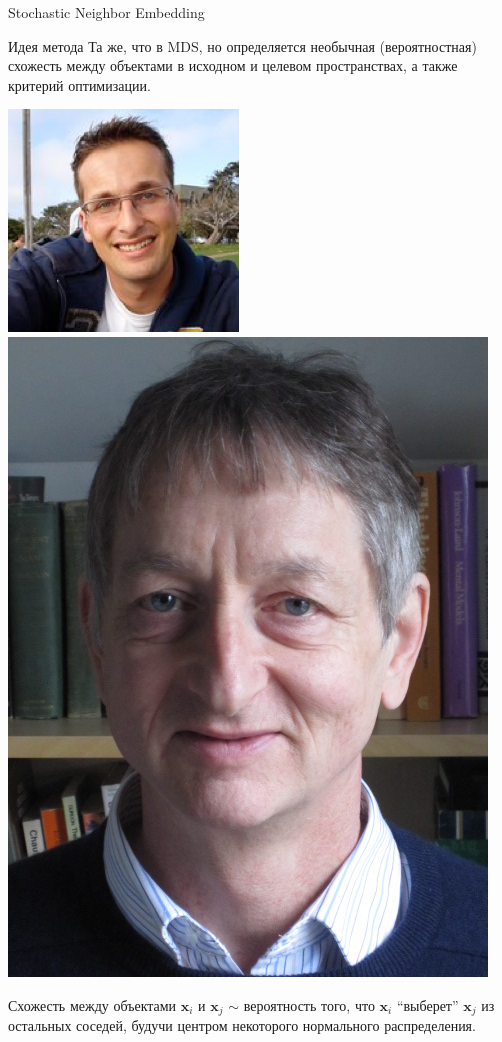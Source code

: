 \documentclass[10pt]{beamer}
\begin{document}
\begin{frame}{Stochastic Neighbor Embedding}

\begin{block}{Идея метода}
Та же, что в MDS, но определяется необычная (вероятностная) схожесть между объектами в исходном и целевом пространствах, а также критерий оптимизации.
\end{block}

\begin{center}
\includegraphics[scale=0.3]{images/maaten.png}\;\;
\includegraphics[scale=0.26]{images/hinton.jpg}
\end{center}

\vspace{1em}
Схожесть между объектами $\mathbf{x}_i$ и $\mathbf{x}_j$ $\sim$ вероятность того, что $\mathbf{x}_i$ ``выберет'' $\mathbf{x}_j$ из остальных соседей, будучи центром некоторого нормального распределения.

\end{frame}
\end{document}
